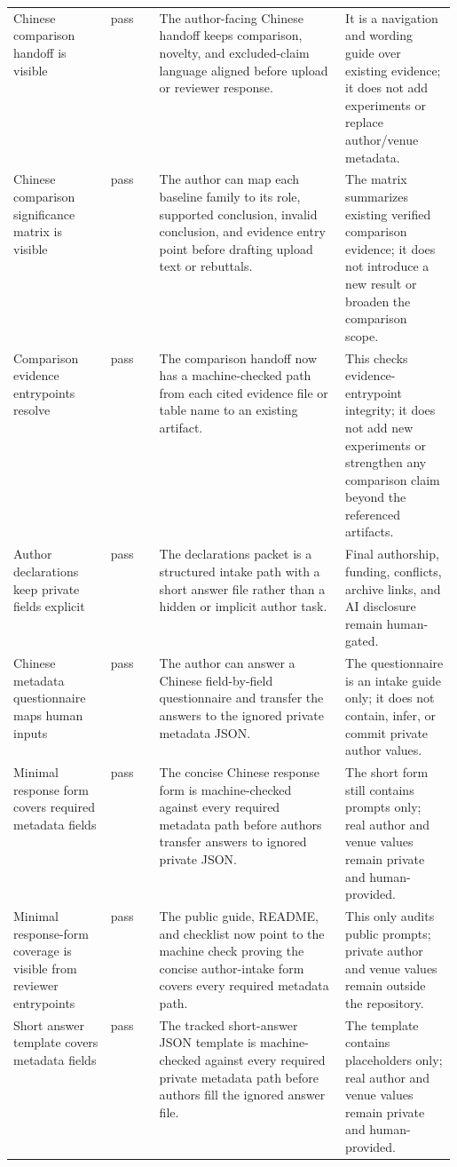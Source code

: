 \begin{tabularx}{\linewidth}{>{\raggedright\arraybackslash}p{0.22\linewidth}>{\raggedright\arraybackslash}p{0.11\linewidth}>{\raggedright\arraybackslash}X>{\raggedright\arraybackslash}p{0.25\linewidth}}
Chinese comparison handoff is visible & pass & The author-facing Chinese handoff keeps comparison, novelty, and excluded-claim language aligned before upload or reviewer response. & It is a navigation and wording guide over existing evidence; it does not add experiments or replace author/venue metadata. \\
Chinese comparison significance matrix is visible & pass & The author can map each baseline family to its role, supported conclusion, invalid conclusion, and evidence entry point before drafting upload text or rebuttals. & The matrix summarizes existing verified comparison evidence; it does not introduce a new result or broaden the comparison scope. \\
Comparison evidence entrypoints resolve & pass & The comparison handoff now has a machine-checked path from each cited evidence file or table name to an existing artifact. & This checks evidence-entrypoint integrity; it does not add new experiments or strengthen any comparison claim beyond the referenced artifacts. \\
Author declarations keep private fields explicit & pass & The declarations packet is a structured intake path with a short answer file rather than a hidden or implicit author task. & Final authorship, funding, conflicts, archive links, and AI disclosure remain human-gated. \\
Chinese metadata questionnaire maps human inputs & pass & The author can answer a Chinese field-by-field questionnaire and transfer the answers to the ignored private metadata JSON. & The questionnaire is an intake guide only; it does not contain, infer, or commit private author values. \\
Minimal response form covers required metadata fields & pass & The concise Chinese response form is machine-checked against every required metadata path before authors transfer answers to ignored private JSON. & The short form still contains prompts only; real author and venue values remain private and human-provided. \\
Minimal response-form coverage is visible from reviewer entrypoints & pass & The public guide, README, and checklist now point to the machine check proving the concise author-intake form covers every required metadata path. & This only audits public prompts; private author and venue values remain outside the repository. \\
Short answer template covers metadata fields & pass & The tracked short-answer JSON template is machine-checked against every required private metadata path before authors fill the ignored answer file. & The template contains placeholders only; real author and venue values remain private and human-provided. \\

\end{tabularx}
